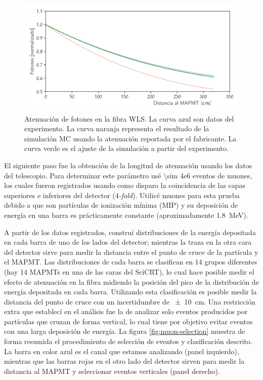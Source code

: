 \begin{figure}
        \centering
        \includegraphics[width=\textwidth]{data_atlength.pdf}
        \caption{Atenuación de fotones en la fibra WLS. La curva azul son datos del experimento. La curva naranja representa el resultado de la simulación MC usando la atenuación reportada por el fabricante. La curva verde es el ajuste de la simulación a partir del experimento.}
        \label{fig:atlength}
\end{figure}

El siguiente paso fue la obtención de la longitud de atenuación usando los datos del telescopio. Para determinar este parámetro usé \num{\sim 4e6} eventos de muones, los cuales fueron registrados usando como disparo la coincidencia de las capas superiores e inferiores del detector (\emph{$4$-fold}). Utilicé muones para esta prueba debido a que son partículas de ionización mínima (MIP) y su deposición de energía en una barra es prácticamente constante (aproximadamente \SI{1.8}{\mega\electronvolt}).

A partir de los datos registrados, construí distribuciones de la energía depositada en cada barra de uno de los lados del detector; mientras la traza en la otra cara del detector sirve para medir la distancia entre el punto de cruce de la partícula y el MAPMT. Las distribuciones de cada barra se clasifican en $14$ grupos diferentes (hay \num{14} MAPMTs en una de las caras del SciCRT), lo cual hace posible medir el efecto de atenuación en la fibra midiendo la posición del pico de la distribución de energía depositada en cada barra. Utilizando esta clasificación es posible medir la distancia del punto de cruce con un incertidumbre de \SI{\pm 10}{\cm}. Una restricción extra que establecí en el análisis fue la de analizar solo eventos producidos por partículas que cruzan de forma vertical, lo cual tiene por objetivo evitar eventos con una larga deposición de energía. La figura \ref{fig:muon-selection} muestra de forma resumida el procedimiento de selección de eventos y clasificación descrito. La barra en color azul es el canal que estamos analizando (panel izquierdo), mientras que las barras rojas en el otro lado del detector sirven para medir la distancia al MAPMT y seleccionar eventos verticales (panel derecho).

